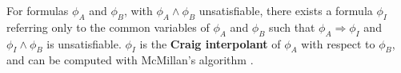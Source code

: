 \documentclass[twocolumn]{article}
\makeatletter
\def\subsection{\@startsection {subsection}{2}{\z@}{16pt plus 2pt minus 2pt}
{6pt plus 2pt minus 2pt}{\normalsize\sl
\edef\@svsec{\thesubsection.\ }}}
\def\thesubsection{\Alph{subsection}}
\makeatother
\begin{document}
 




For formulas $\phi_A$ and $\phi_B$,
with $\phi_A\wedge \phi_B$ unsatisfiable,
there exists a formula $\phi_I$ referring only
to the common variables of $\phi_A$ and $\phi_B$ such that $\phi_A\Rightarrow \phi_I$
and $\phi_I\wedge \phi_B$ is unsatisfiable.
$\phi_I$ is the \textbf{Craig interpolant} \cite{Craig} of $\phi_A$ with respect to $\phi_B$,
and can be computed with McMillan's algorithm \cite{interp_McMillan}.

\end{document}
